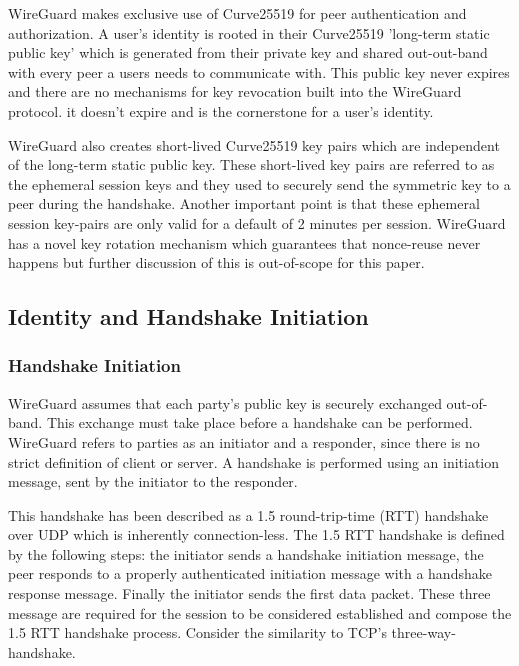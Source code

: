 \documentclass [11pt, proquest] {uwthesis}[2020/02/24]
\begin{document}
WireGuard makes exclusive use of Curve25519 for peer authentication and authorization. A user's identity is rooted in their Curve25519 'long-term static public key' which is generated from their private key and shared out-out-band with every peer a users needs to communicate with. 
This public key never expires and there are no mechanisms for key revocation built into the WireGuard protocol. it doesn't expire and is the cornerstone for a user's identity. 

WireGuard also creates short-lived Curve25519 key pairs which are independent of the long-term static public key. These short-lived key pairs are referred to as the ephemeral session keys and they used to securely send the symmetric key to a peer during the handshake. Another important point is that these ephemeral session key-pairs are only valid for a default of 2 minutes per session. WireGuard has a novel key rotation mechanism which guarantees that nonce-reuse never happens but further discussion of this is out-of-scope for this paper. 

\subsection {Identity and Handshake Initiation}

\subsubsection{Handshake Initiation}
\label{sec:handshakeInitiation}
WireGuard assumes that each party's public key is securely exchanged out-of-band. This exchange must take place before a handshake can be performed. WireGuard refers to parties as an initiator and a responder, since there is no strict definition of client or server. A handshake is performed using an initiation message, sent by the initiator to the responder. 

This handshake has been described as a 1.5 round-trip-time (RTT) handshake over UDP which is inherently connection-less. The 1.5 RTT handshake is defined by the following steps: the initiator sends a handshake initiation message, the peer responds to a properly authenticated initiation message with a handshake response message. Finally the initiator sends the first data packet. These three message are required for the session to be considered established and compose the 1.5 RTT handshake process. Consider the similarity to TCP's three-way-handshake.
\end{document}
